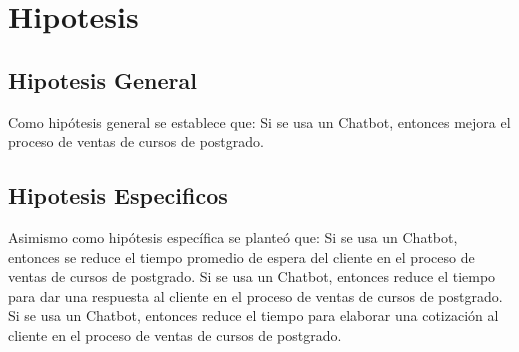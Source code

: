 \documentclass[10pt,a4paper]{article}
\begin{document}
	
	\section{Hipotesis}
		    
	\subsection{Hipotesis General}

	Como hipótesis general se establece que: Si se usa un Chatbot, entonces mejora el proceso de ventas de cursos de postgrado.

 

    \subsection{Hipotesis Especificos}
	Asimismo como hipótesis específica se planteó que: Si se usa un Chatbot, entonces se reduce el tiempo promedio de espera del cliente en el proceso de ventas de cursos de postgrado. Si se usa un Chatbot, entonces reduce el tiempo para dar una respuesta al cliente en el proceso de ventas de cursos de postgrado. Si se usa un Chatbot, entonces reduce el tiempo para elaborar una cotización al cliente en el proceso de ventas de cursos de postgrado.

 		    
	
\end{document}
